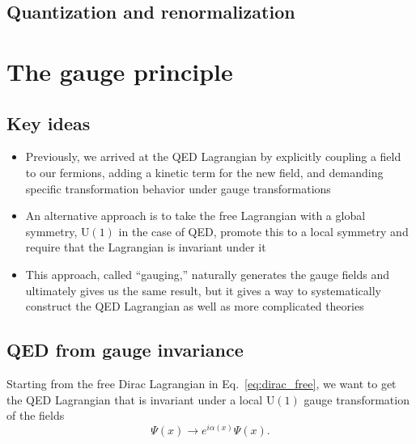 \documentclass[12pt]{memoir}
\begin{document}
\section{Quantization and renormalization}

\chapter{The gauge principle}

\section{Key ideas}

\begin{itemize}
  \item Previously, we arrived at the QED Lagrangian by explicitly coupling a field to our fermions,
    adding a kinetic term for the new field,
    and demanding specific transformation behavior under gauge transformations
  \item An alternative approach is to take the free Lagrangian with a global symmetry,
    $\text{U}(1)$ in the case of QED,
    promote this to a local symmetry and require that the Lagrangian is invariant under it
  \item This approach, called ``gauging,'' naturally generates the gauge fields and ultimately gives us the same result,
    but it gives a way to systematically construct the QED Lagrangian as well as more complicated theories
\end{itemize}

\section{QED from gauge invariance}

Starting from the free Dirac Lagrangian in Eq.~\ref{eq:dirac_free},
we want to get the QED Lagrangian
that is invariant under a local $\text{U}(1)$ gauge transformation of the fields
\begin{equation}
  \Psi(x) \rightarrow e^{i \alpha(x)}\Psi(x).
\end{equation}
\end{document}
